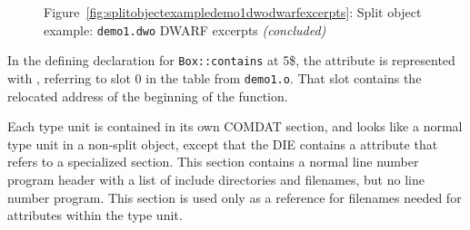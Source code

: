 \begin{figure}
\begin{center}
\vspace{3mm}
Figure~\ref{fig:splitobjectexampledemo1dwodwarfexcerpts}: Split object example: \texttt{demo1.dwo} DWARF excerpts \textit{(concluded)}
\end{center}
\end{figure}

In the defining declaration for \texttt{Box::contains} at 5\$, the
\DWATlowpc{} attribute is represented with \DWFORMaddrx,
referring to slot 0 in the \dotdebugaddr{} table from \texttt{demo1.o}.
That slot contains the relocated address of the beginning of the
function.

Each type unit is contained in its own COMDAT \dotdebuginfodwo{}
section, and looks like a normal type unit in a non-split object,
except that the \DWTAGtypeunit{} DIE contains a \DWATstmtlist{}
attribute that refers to a specialized \dotdebuglinedwo{}
section. This
section contains a normal line number
program header with a list of include directories and filenames,
but no line number program. This section is used only as a
reference for filenames needed for \DWATdeclfile{} attributes
within the type unit.

